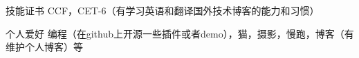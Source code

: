 
\vspace{-1.5mm}
\begin{cvskills}

\cvskill
{技能证书}
{CCF，CET-6（有学习英语和翻译国外技术博客的能力和习惯）}

\cvskill
{个人爱好}
{编程（在github上开源一些插件或者demo），猫，摄影，慢跑，博客（有维护个人博客）等}

\end{cvskills}